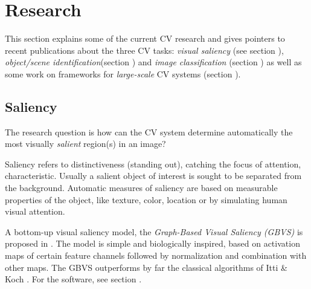 \section{Research}
\label{sec:pubs}

This section explains some of the current CV research and gives pointers to recent publications about the three CV tasks:  {\em visual saliency} (see section \underline{}), {\em object/scene identification}(section \underline{}) and {\em image classification} (section \underline{}) as well as some work on frameworks for {\em large-scale} CV systems (section \underline{}).

\subsection{Saliency}\label{subsec:sal}

The research question is how can the CV system determine automatically the most visually {\em salient} region(s) in an image? 

Saliency refers to distinctiveness (standing out), catching the focus of attention, characteristic. Usually a salient object of interest is sought to be separated from the background. Automatic measures of saliency are based on measurable properties of the object,
like texture, color, location or by simulating human visual attention.

A bottom-up visual saliency model, the {\em Graph-Based Visual Saliency (GBVS)} is proposed in \cite{Harel07graph-basedvisual}. The model is simple and biologically inspired, based on activation maps of certain feature channels followed by normalization and combination with other maps. The GBVS outperforms by far the classical algorithms of Itti \& Koch \cite{Itti_Koch01nrn}. For the software, see  section .


